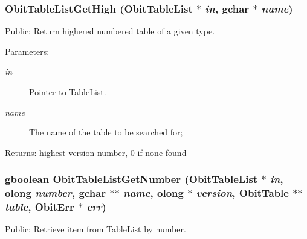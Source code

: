 \subsubsection{ Obit\-Table\-List\-Get\-High ({\bf Obit\-Table\-List} $\ast$ {\em in}, gchar $\ast$ {\em name})}\label{ObitTableList_8c_a16}


Public: Return highered numbered table of a given type. 

\begin{Desc}
\item[Parameters:]
\begin{description}
\item[{\em in}]Pointer to Table\-List. \item[{\em name}]The name of the table to be searched for; \end{description}
\end{Desc}
\begin{Desc}
\item[Returns:]highest version number, 0 if none found \end{Desc}
\subsubsection{\setlength{\rightskip}{0pt plus 5cm}gboolean Obit\-Table\-List\-Get\-Number ({\bf Obit\-Table\-List} $\ast$ {\em in}, {\bf olong} {\em number}, gchar $\ast$$\ast$ {\em name}, {\bf olong} $\ast$ {\em version}, {\bf Obit\-Table} $\ast$$\ast$ {\em table}, {\bf Obit\-Err} $\ast$ {\em err})}\label{ObitTableList_8c_a15}


Public: Retrieve item from Table\-List by number. 

